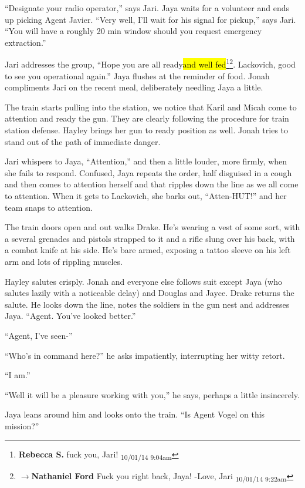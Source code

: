 ``Designate your radio operator,'' says Jari.  Jaya waits for a volunteer and ends up picking Agent Javier.   ``Very well, I'll wait for his signal for pickup,'' says Jari.  ``You will have a roughly 20 min window should you request emergency extraction.''

Jari addresses the group, ``Hope you are all ready\hl{and well fed}\footnote{\textbf{Rebecca S. }fuck you, Jari! \textsubscript{10/01/14 9:04am}}\footnote{$\rightarrow$\textbf{Nathaniel Ford }Fuck you right back, Jaya! -Love, Jari \textsubscript{10/01/14 9:22am}}.  Lackovich, good to see you operational again.''  Jaya flushes at the reminder of food.  Jonah compliments Jari on the recent meal, deliberately needling Jaya a little.

The train starts pulling into the station, we notice that Karil and Micah come to attention and ready the gun. They are clearly following the procedure for train station defense.  Hayley brings her gun to ready position as well.  Jonah tries to stand out of the path of immediate danger.

Jari whispers to Jaya, ``Attention,'' and then a little louder, more firmly, when she fails to respond.  Confused, Jaya repeats the order, half disguised in a cough and then comes to attention herself and that ripples down the line as we all come to attention.  When it gets to Lackovich, she barks out, ``Atten-HUT!'' and her team snaps to attention.



The train doors open and out walks Drake.  He's wearing a vest of some sort, with a several grenades and pistols strapped to it and a rifle slung over his back, with a combat knife at his side.  He's bare armed, exposing a tattoo sleeve on his left arm and lots of rippling muscles.



Hayley salutes crisply.  Jonah and everyone else follows suit except Jaya (who salutes lazily with a noticeable delay) and Douglas and Jayce.  Drake returns the salute.  He looks down the line, notes the soldiers in the gun nest and addresses Jaya.  ``Agent.  You've looked better.''

``Agent, I've seen-''

``Who's in command here?'' he asks impatiently, interrupting her witty retort.

``I am.''

``Well it will be a pleasure working with you,'' he says, perhaps a little insincerely.

Jaya leans around him and looks onto the train.  ``Is Agent Vogel on this mission?''

